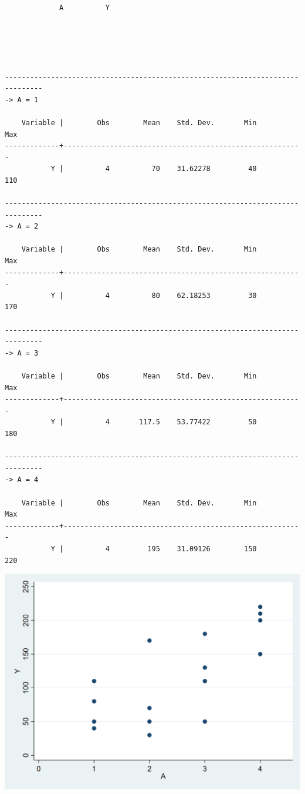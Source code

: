 \documentclass[
  10pt,
]{book}
\begin{document}
\begin{verbatim}
             A          Y





-------------------------------------------------------------------------------
-> A = 1

    Variable |        Obs        Mean    Std. Dev.       Min        Max
-------------+---------------------------------------------------------
           Y |          4          70    31.62278         40        110

-------------------------------------------------------------------------------
-> A = 2

    Variable |        Obs        Mean    Std. Dev.       Min        Max
-------------+---------------------------------------------------------
           Y |          4          80    62.18253         30        170

-------------------------------------------------------------------------------
-> A = 3

    Variable |        Obs        Mean    Std. Dev.       Min        Max
-------------+---------------------------------------------------------
           Y |          4       117.5    53.77422         50        180

-------------------------------------------------------------------------------
-> A = 4

    Variable |        Obs        Mean    Std. Dev.       Min        Max
-------------+---------------------------------------------------------
           Y |          4         195    31.09126        150        220
\end{verbatim}

\begin{center}\includegraphics[width=0.85\linewidth]{figs/stata-fig-11-2} \end{center}
\end{document}
